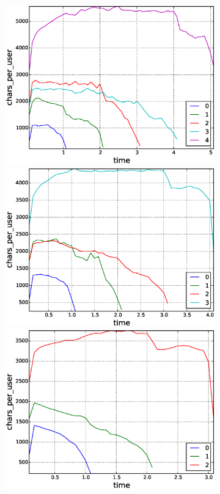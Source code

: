 \begin{figure}[!tb]
\begin{subfigure}{1\textwidth}
    \includegraphics[scale=0.285]{./images/avr_comment_length_user_for_surviving_year_for_2010.eps}
    \includegraphics[scale=0.285]{./images/avr_comment_length_user_for_surviving_year_for_2011.eps}
    \includegraphics[scale=0.285]{./images/avr_comment_length_user_for_surviving_year_for_2012.eps}

\end{subfigure}
\end{figure}
